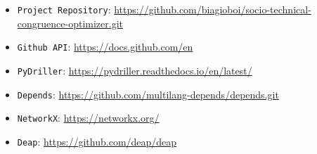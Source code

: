 \documentclass[sigconf]{acmart}
\begin{document}
\begin{itemize}
\item {\verb|Project Repository|}: \url{https://github.com/biagioboi/socio-technical-congruence-optimizer.git}
\item {\verb|Github API|}: \url{https://docs.github.com/en}
\item {\verb|PyDriller|}: \url{https://pydriller.readthedocs.io/en/latest/}
\item {\verb|Depends|}: \url{https://github.com/multilang-depends/depends.git}
\item {\verb|NetworkX|}: \url{https://networkx.org/}
\item {\verb|Deap|}: \url{https://github.com/deap/deap}
\end{itemize}
\end{document}
